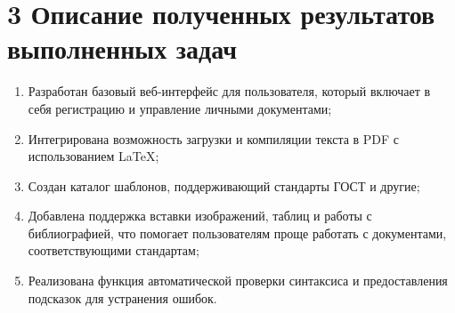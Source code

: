 \documentclass[a4paper,12pt]{article}
\begin{document}
\newpage

\section{3 Описание полученных результатов выполненных задач}
\begin{enumerate}
    \item Разработан базовый веб-интерфейс для пользователя, который включает в себя регистрацию и управление личными документами;
    \item Интегрирована возможность загрузки и компиляции текста в PDF с использованием LaTeX;
    \item Создан каталог шаблонов, поддерживающий стандарты ГОСТ и другие;
    \item Добавлена поддержка вставки изображений, таблиц и работы с библиографией, что помогает пользователям проще работать с документами, соответствующими стандартам;
    \item Реализована функция автоматической проверки синтаксиса и предоставления подсказок для устранения ошибок.
    
 \end{enumerate}
\end{document}
